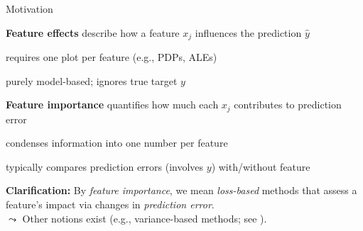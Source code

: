 \documentclass[10pt,compress,t,notes=noshow, xcolor=table]{beamer}
\begin{document}
	
	
	

	

\begin{framei}[align=top]{Motivation}
\item<1-3> \textbf{Feature effects} describe how a feature $x_j$ influences the prediction $\hat{y}$
\begin{itemizeS}
\item requires one plot per feature (e.g., PDPs, ALEs)
\item purely model-based; ignores true target $y$ %
\end{itemizeS}
\item<2-3> \textbf{Feature importance} quantifies how much each $x_j$ contributes to prediction error%
\begin{itemizeS}
\item condenses information into one number per feature
\item typically compares prediction errors (involves $y$) with/without feature
\end{itemizeS}
\item<3> \textbf{Clarification:} By \emph{feature importance}, we mean \emph{loss-based} methods that assess a feature's impact via changes in \emph{prediction error}. \\
$\leadsto$
Other notions exist (e.g., variance-based methods; see ).
\end{framei}
\end{document}
